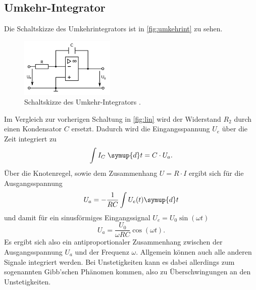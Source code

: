\subsection{Umkehr-Integrator}
Die Schaltskizze des Umkehrintegrators ist in \autoref{fig:umkehrint} zu sehen.
\begin{figure}[H]
    \centering
    \includegraphics[width=0.4\textwidth]{integrator.png}
    \caption{Schaltskizze des Umkehr-Integrators \cite{anleitung}.}
    \label{fig:umkehrint}
\end{figure}
Im Vergleich zur vorherigen Schaltung in \autoref{fig:lin} wird der Widerstand $R_2$ durch einen
Kondensator $C$ ersetzt.
Dadurch wird die Eingangsspannung $U_e$ über die Zeit integriert zu
\begin{equation*}
    \int I_C \; \symup{d} t = C \cdot U_a.
\end{equation*}
Über die Knotenregel, sowie dem Zusammenhang $U = R \cdot I$ ergibt sich für die Ausgangsspannung
\begin{equation*}
    U_a = - \frac{1}{RC} \int U_e (t) \symup{d} t
\end{equation*}
und damit für ein sinusförmiges Eingangssignal $U_e = U_0 \sin(\omega t)$
\begin{equation*}
    U_a = \frac{U_0}{\omega R C} \cos(\omega t).
\end{equation*}
Es ergibt sich also ein antiproportionaler Zusammenhang zwischen der Ausgangsspannung $U_a$
und der Frequenz $\omega$. Allgemein können auch alle anderen Signale integriert werden.
Bei Unstetigkeiten kann es dabei allerdings zum sogenannten Gibb'schen Phänomen kommen,
also zu Überschwingungen an den Unstetigkeiten. 

